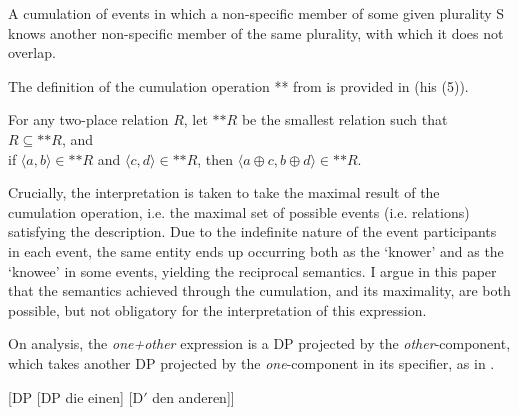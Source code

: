 \documentclass[output=paper,colorlinks,citecolor=brown]{langscibook}
\begin{document}
A cumulation of events in which a non-specific member of some given plurality S knows another non-specific member of the same plurality, with which it does not overlap.
\z
\z

%
% 

\noindent The definition of the cumulation operation ** from \citet[][304]{s98} is provided in  (his (5)).

\ea\label{ex:Sternefeld}
For any two-place relation $R$, let $\text{**}R$ be the smallest relation such that\\
 \ea $R \subseteq \text{**}R$, and\\
 \ex if $\langle a, b\rangle \in \text{**}R$ and $\langle c, d \rangle \in \text{**}R$, then $\langle a \oplus c, b \oplus d\rangle \in \text{**}R$. 
\z
\z

\noindent Crucially, the interpretation is taken to take the maximal result of the cumulation operation, i.e. the maximal set of possible events (i.e. relations) satisfying the description. Due to the indefinite nature of the event participants in each event, the same entity ends up occurring both as the `knower' and as the `knowee' in some events, yielding the reciprocal semantics. I argue in this paper that the semantics achieved through the cumulation, and its maximality, are both possible, but not obligatory for the interpretation of this expression. 

On  analysis, the \textit{one+other} expression is a DP projected by the \textit{other}-component, which takes another DP projected by the \textit{one}-component in its specifier, as in .

\ea\label{ex:DP} 
[DP [DP die einen] [D$'$ den anderen]]
\z
\end{document}
